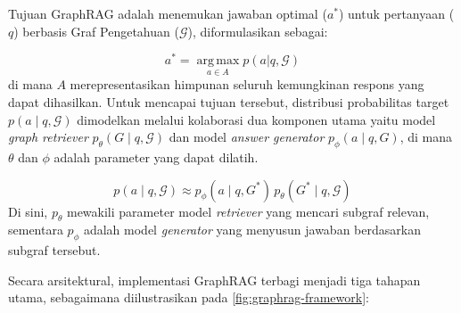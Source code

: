 Tujuan GraphRAG adalah menemukan jawaban optimal ($a^*$) untuk pertanyaan ($q$) berbasis Graf Pengetahuan ($\mathcal{G}$), diformulasikan sebagai:

\begin{equation}
    a^* = \operatorname*{arg\,max}_{a \in A} p(a|q, \mathcal{G})
    \label{eq:graphrag_goal}
\end{equation}
di mana \(A\) merepresentasikan himpunan seluruh kemungkinan respons yang dapat dihasilkan. Untuk mencapai tujuan tersebut, distribusi probabilitas target \(p(a \mid q, \mathcal{G})\) dimodelkan melalui kolaborasi dua komponen utama yaitu model \textit{graph retriever} \(p_\theta(G \mid q, \mathcal{G})\) dan model \textit{answer generator} \(p_\phi(a \mid q, G)\), di mana \(\theta\) dan \(\phi\) adalah parameter yang dapat dilatih.

\begin{equation}
    p(a \mid q, \mathcal{G}) \approx p_\phi(a \mid q, G^*)\, p_\theta(G^* \mid q, \mathcal{G})
    \label{eq:graphrag_decomposition_approx}
\end{equation}
Di sini, $p_\theta$ mewakili parameter model \textit{retriever} yang mencari subgraf relevan, sementara $p_\phi$ adalah model \textit{generator} yang menyusun jawaban berdasarkan subgraf tersebut.

Secara arsitektural, implementasi GraphRAG terbagi menjadi tiga tahapan utama, sebagaimana diilustrasikan pada \ref{fig:graphrag-framework}:

